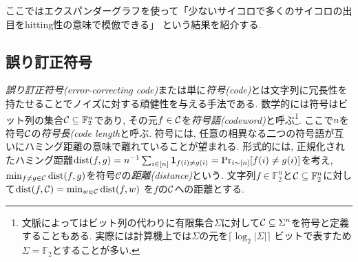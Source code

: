 ここではエクスパンダーグラフを使って「少ないサイコロで多くのサイコロの出目をhitting性の意味で模倣できる」
という結果を紹介する.

\subsection{誤り訂正符号}
\emph{誤り訂正符号(error-correcting code)}または単に\emph{符号(code)}とは文字列に冗長性を持たせることでノイズに対する頑健性を与える手法である.
数学的には符号はビット列の集合$\mathcal{C}\subseteq\mathbb{F}_2^n$であり, その元$f\in\mathcal{C}$を\emph{符号語(codeword)}と呼ぶ\footnote{文脈によってはビット列の代わりに有限集合$\Sigma$に対して$\mathcal{C}\subseteq\Sigma^n$を符号と定義することもある. 実際には計算機上では$\Sigma$の元を$\lceil\log_2 |\Sigma|\rceil$ ビットで表すため$\Sigma=\mathbb{F}_2$とすることが多い.}.
ここで$n$を符号$\mathcal{C}$の\emph{符号長(code length}と呼ぶ.
符号には, 任意の相異なる二つの符号語が互いにハミング距離の意味で離れていることが望まれる.
形式的には, 正規化されたハミング距離$\mathrm{dist}(f,g)=n^{-1}\sum_{i\in[n]}\mathbf{1}_{f(i)\neq g(i)}=\Pr_{i\sim[n]}[f(i)\neq g(i)]$を考え, $\min_{f\neq g\in\mathcal{C}}\mathrm{dist}(f,g)$を符号$\mathcal{C}$の\emph{距離(distance)}という.
文字列$f\in\mathbb{F}_2^n$と$\mathcal{C}\subseteq\mathbb{F}_2^n$に対して$\mathrm{dist}(f,\mathcal{C})=\min_{w\in\mathcal{C}}\mathrm{dist}(f,w)$
を$f$の$\mathcal{C}$への距離とする.


